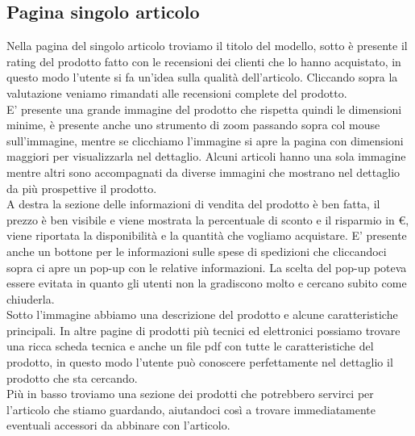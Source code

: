 \documentclass[12pt]{article}
\begin{document}
	\subsection{Pagina singolo articolo}
	\vspace{0.4cm}
	Nella pagina del singolo articolo troviamo il titolo del modello, sotto è presente il rating del prodotto fatto con le recensioni dei clienti che lo hanno acquistato, in questo modo l'utente si fa un'idea sulla qualità dell'articolo. Cliccando sopra la valutazione veniamo rimandati alle recensioni complete del prodotto.
	\\ E' presente una grande immagine del prodotto che rispetta quindi le dimensioni minime, è presente anche uno strumento di zoom passando sopra col mouse sull'immagine, mentre se clicchiamo l'immagine si apre la pagina con dimensioni maggiori per visualizzarla nel dettaglio. Alcuni articoli hanno una sola immagine mentre altri sono accompagnati da diverse immagini che mostrano nel dettaglio da più prospettive il prodotto. \\
	 A destra la sezione delle informazioni di vendita del prodotto è ben fatta, il prezzo è ben visibile e viene mostrata la percentuale di sconto e il risparmio in \euro, viene riportata la disponibilità e la quantità che vogliamo acquistare. E' presente anche un bottone per le informazioni sulle spese di spedizioni che cliccandoci sopra ci apre un pop-up con le relative informazioni. La scelta del pop-up poteva essere evitata in quanto gli utenti non la gradiscono molto e cercano subito come chiuderla. \\
	 Sotto l'immagine abbiamo una descrizione del prodotto e alcune caratteristiche principali. In altre pagine di prodotti più tecnici ed elettronici possiamo trovare una ricca scheda tecnica e anche un file pdf con tutte le caratteristiche del prodotto, in questo modo l'utente può conoscere perfettamente nel dettaglio il prodotto che sta cercando. \\ Più in basso troviamo una sezione dei prodotti che potrebbero servirci per l'articolo che stiamo guardando, aiutandoci così a trovare immediatamente eventuali accessori da abbinare con l'articolo.
\end{document}
